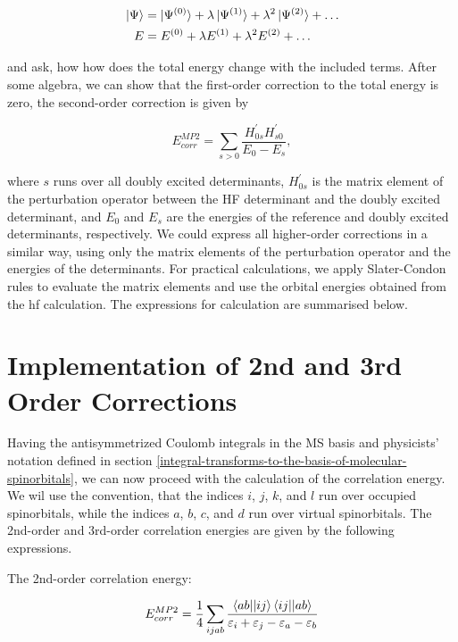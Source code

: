 \documentclass[open=any,parskip=half,11pt]{scrbook}
\begin{document}
\begin{align}
\ket{\Psi}&=\ket{\Psi^{(0)}}+\lambda\ket{\Psi^{(1)}}+\lambda^2\ket{\Psi^{(2)}}+\dots \\
E&=E^{(0)}+\lambda E^{(1)}+\lambda^2 E^{(2)}+\dots
\end{align}

and ask, how how does the total energy change with the included terms. After some algebra, we can show that the first-order correction to the total energy is zero, the second-order correction is given by

\begin{equation}
E_{corr}^{MP2}=\sum_{s>0}\frac{H_{0s}^{'}H_{s0}^{'}}{E_0-E_s},
\end{equation}

where \(s\) runs over all doubly excited determinants, \(H_{0s}^{'}\) is the matrix element of the perturbation operator between the HF determinant and the doubly excited determinant, and \(E_0\) and \(E_s\) are the energies of the reference and doubly excited determinants, respectively. We could express all higher-order corrections in a similar way, using only the matrix elements of the perturbation operator and the energies of the determinants. For practical calculations, we apply Slater-Condon rules to evaluate the matrix elements and use the orbital energies obtained from the \acrshort{hf} calculation. The expressions for calculation are summarised below.

\section{Implementation of 2nd and 3rd Order Corrections}\label{implementation-of-2nd-and-3rd-order-corrections}

Having the antisymmetrized Coulomb integrals in the MS basis and physicists' notation defined in section \ref{integral-transforms-to-the-basis-of-molecular-spinorbitals}, we can now proceed with the calculation of the correlation energy. We wil use the convention, that the indices \(i\), \(j\), \(k\), and \(l\) run over occupied spinorbitals, while the indices \(a\), \(b\), \(c\), and \(d\) run over virtual spinorbitals. The 2nd-order and 3rd-order correlation energies are given by the following expressions.

The 2nd-order correlation energy:

\begin{equation}
E_{corr}^{MP2}=\frac{1}{4}\sum_{ijab}\frac{\braket{ab||ij}\braket{ij||ab}}{\varepsilon_i+\varepsilon_j-\varepsilon_a-\varepsilon_b}
\end{equation}
\end{document}
